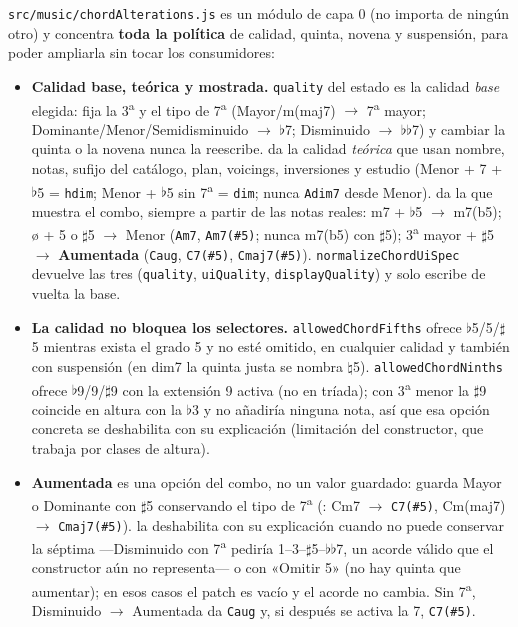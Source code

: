 \documentclass[a4paper,11pt,oneside]{report}
\newcommand{\flt}{\ensuremath{\flat}}
\newcommand{\shp}{\ensuremath{\sharp}}
\begin{document}
\lstinline!src/music/chordAlterations.js! es un módulo de capa 0 (no importa de ningún otro) y concentra \textbf{toda la política} de calidad, quinta, novena y suspensión, para poder ampliarla sin tocar los consumidores:

\begin{itemize}
\item \textbf{Calidad base, teórica y mostrada.} \lstinline!quality! del estado es la calidad \textit{base} elegida: fija la 3\textsuperscript{a} y el tipo de 7\textsuperscript{a} (Mayor/m(maj7) $\to$ 7\textsuperscript{a} mayor; Dominante/Menor/Semidisminuido $\to$ \flt7; Disminuido $\to$ \flt\flt7) y cambiar la quinta o la novena nunca la reescribe. \texttt{} da la calidad \textit{teórica} que usan nombre, notas, sufijo del catálogo, plan, voicings, inversiones y estudio (Menor + 7 + \flt5 = \lstinline!hdim!; Menor + \flt5 sin 7\textsuperscript{a} = \lstinline!dim!; nunca \lstinline!Adim7! desde Menor). \texttt{} da la que muestra el combo, siempre a partir de las notas reales: m7 + \flt5 $\to$ m7(b5); ø + 5 o \shp5 $\to$ Menor (\lstinline!Am7!, \lstinline!Am7(#5)!; nunca m7(b5) con \shp5); 3\textsuperscript{a} mayor + \shp5 $\to$ \textbf{Aumentada} (\lstinline!Caug!, \lstinline!C7(#5)!, \lstinline!Cmaj7(#5)!). \lstinline!normalizeChordUiSpec! devuelve las tres (\lstinline!quality!, \lstinline!uiQuality!, \lstinline!displayQuality!) y \texttt{} solo escribe de vuelta la base.
\item \textbf{La calidad no bloquea los selectores.} \lstinline!allowedChordFifths! ofrece \flt5/5/\shp5 mientras exista el grado 5 y no esté omitido, en cualquier calidad y también con suspensión (en dim7 la quinta justa se nombra $\natural$5). \lstinline!allowedChordNinths! ofrece \flt9/9/\shp9 con la extensión 9 activa (no en tríada); con 3\textsuperscript{a} menor la \shp9 coincide en altura con la \flt3 y no añadiría ninguna nota, así que esa opción concreta se deshabilita con su explicación (limitación del constructor, que trabaja por clases de altura).
\item \textbf{Aumentada} es una opción del combo, no un valor guardado: \texttt{} guarda Mayor o Dominante con \shp5 conservando el tipo de 7\textsuperscript{a} (\texttt{}: Cm7 $\to$ \lstinline!C7(#5)!, Cm(maj7) $\to$ \lstinline!Cmaj7(#5)!). \texttt{} la deshabilita con su explicación cuando no puede conservar la séptima ---Disminuido con 7\textsuperscript{a} pediría 1--3--\shp5--\flt\flt7, un acorde válido que el constructor aún no representa--- o con «Omitir 5» (no hay quinta que aumentar); en esos casos el patch es vacío y el acorde no cambia. Sin 7\textsuperscript{a}, Disminuido $\to$ Aumentada da \lstinline!Caug! y, si después se activa la 7, \lstinline!C7(#5)!.

\end{itemize}
\end{document}
